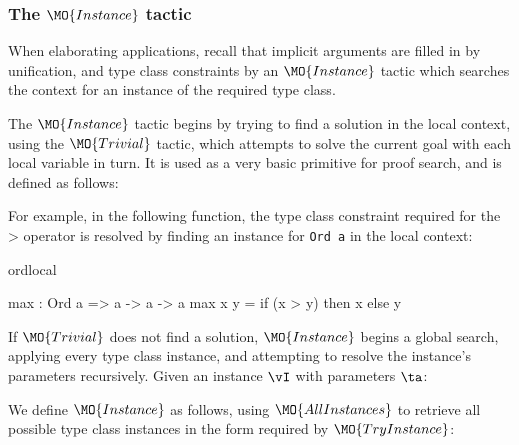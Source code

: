 \subsubsection{The $\MO{Instance}$ tactic}

\label{sect:instance}

When elaborating applications, recall that implicit arguments are filled in by
unification, and type class constraints by an $\MO{Instance}$ tactic which searches
the context for an instance of the required type class. 

The $\MO{Instance}$ tactic begins by trying to find a solution in the local context,
using the $\MO{Trivial}$ tactic, which attempts
to solve the current goal with each local variable in turn. It is used as a very
basic primitive for proof search, and is defined as follows:


For example, in the following function, the type class constraint required for
the $\texttt{>}$ operator is resolved by finding an instance for \texttt{Ord a}
in the local context:

\begin{SaveVerbatim}{ordlocal}

max : Ord a => a -> a -> a
max x y = if (x > y) then x else y

\end{SaveVerbatim}

If $\MO{Trivial}$ does not find a solution, $\MO{Instance}$ begins a global search,
applying every type class instance, and attempting to resolve the instance's parameters
recursively. Given an instance $\vI$ with parameters $\ta$:


We define $\MO{Instance}$ as follows, using $\MO{AllInstances}$ to retrieve
all possible type class instances in the form required by $\MO{TryInstance}$:

